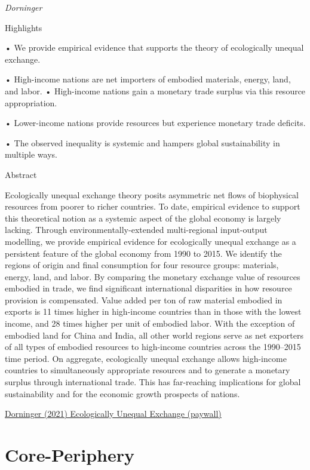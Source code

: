 \documentclass[
]{book}
\begin{document}
\emph{Dorninger}

Highlights

• We provide empirical evidence that supports the theory of ecologically unequal exchange.

• High-income nations are net importers of embodied materials, energy, land, and labor.
• High-income nations gain a monetary trade surplus via this resource appropriation.

• Lower-income nations provide resources but experience monetary trade deficits.

• The observed inequality is systemic and hampers global sustainability in multiple ways.

Abstract

Ecologically unequal exchange theory posits asymmetric net flows of biophysical resources from poorer to richer countries. To date, empirical evidence to support this theoretical notion as a systemic aspect of the global economy is largely lacking. Through environmentally-extended multi-regional input-output modelling, we provide empirical evidence for ecologically unequal exchange as a persistent feature of the global economy from 1990 to 2015. We identify the regions of origin and final consumption for four resource groups: materials, energy, land, and labor. By comparing the monetary exchange value of resources embodied in trade, we find significant international disparities in how resource provision is compensated. Value added per ton of raw material embodied in exports is 11 times higher in high-income countries than in those with the lowest income, and 28 times higher per unit of embodied labor. With the exception of embodied land for China and India, all other world regions serve as net exporters of all types of embodied resources to high-income countries across the 1990--2015 time period. On aggregate, ecologically unequal exchange allows high-income countries to simultaneously appropriate resources and to generate a monetary surplus through international trade. This has far-reaching implications for global sustainability and for the economic growth prospects of nations.

\href{https://www.sciencedirect.com/science/article/abs/pii/S0921800920300938}{Dorninger (2021) Ecologically Unequal Exchange (paywall)}

\hypertarget{core-periphery}{%
\section{Core-Periphery}\label{core-periphery}}
\end{document}
